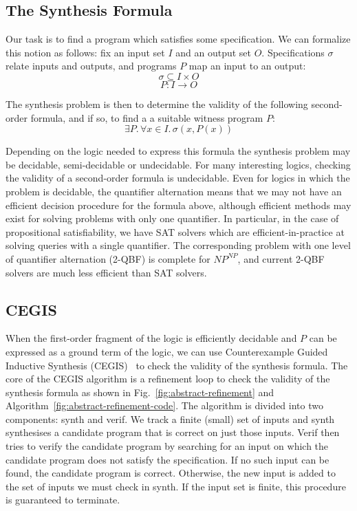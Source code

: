 \documentclass[a4paper]{llncs}
\begin{document}
\subsection{The Synthesis Formula}
\label{sec:abstract-formula}

Our task is to find a program which satisfies some specification.  We can formalize this
notion as follows: fix an input set $I$ and an output set $O$.  Specifications $\sigma$
relate inputs and outputs, and programs $P$ map an input to an output:
%
$$ \sigma \subseteq I \times O $$
$$ P : I \rightarrow O$$

The synthesis problem is then to determine the validity of the following
second-order formula, and if so, to find a a suitable witness program $P$:
%
$$\exists P .\, \forall x \in I.\, \sigma(x, P(x))$$

Depending on the logic needed to express this formula the synthesis problem
may be decidable, semi-decidable or undecidable.  For many interesting
logics, checking the validity of a second-order formula is undecidable. 
Even for logics in which the problem is decidable, the quantifier
alternation means that we may not have an efficient decision procedure for
the formula above, although efficient methods may exist for solving problems
with only one quantifier.  In particular, in the case of propositional
satisfiability, we have SAT solvers which are efficient-in-practice at
solving queries with a single quantifier.  The corresponding problem with
one level of quantifier alternation (2-QBF) is complete for $NP^{NP}$, and
current 2-QBF solvers are much less efficient than SAT solvers.

\subsection{CEGIS}

When the first-order fragment of the logic is efficiently decidable and $P$ can be
expressed as a ground term of the logic, we can use
Counterexample Guided Inductive Synthesis (CEGIS)~\cite{lezama-thesis,sketch} to
check the validity of the synthesis formula.  The core of the CEGIS algorithm is
a refinement loop to check the
validity of the synthesis formula as shown in Fig.~\ref{fig:abstract-refinement} and
Algorithm~\ref{fig:abstract-refinement-code}.  The algorithm is divided into two
components: {\sc synth} and {\sc verif}.  We track a finite (small) set of inputs
and {\sc synth} synthesises a candidate program that is correct on just those inputs.
{\sc Verif} then tries to verify the candidate program by searching for an input on
which the candidate program does not satisfy the specification.  If no such input
can be found, the candidate program is correct.  Otherwise, the new input is added
to the set of inputs we must check in {\sc synth}.  If the input set is finite, this
procedure is guaranteed to terminate.
\end{document}
